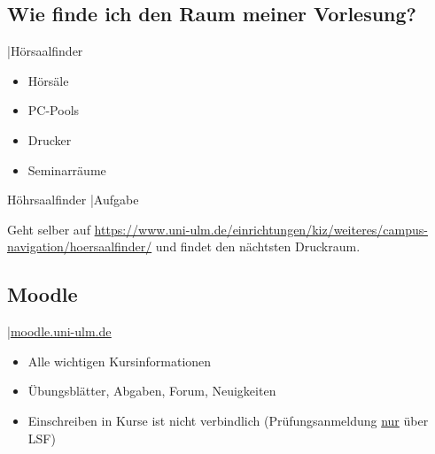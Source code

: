 \documentclass[
	aspectratio=169, 
	10pt 
]{beamer}
\begin{document}
\subsection{Wie finde ich den Raum meiner Vorlesung?}
\begin{frame}{\insertsubsection \space|\space Hörsaalfinder}
    \begin{fancycolumns}[widths={30}]
        
        \nextcolumn
        \centering
        \begin{minipage}[C]{0.8\textwidth}
            \begin{itemize}
                \item Hörsäle
                \item PC-Pools
                \item Drucker 
                \item Seminarräume 
            \end{itemize}
        \end{minipage}
    \end{fancycolumns}
\end{frame}

\begin{frame}{Höhrsaalfinder \space|\space Aufgabe}
    \begin{fancycolumns}[widths={70}]
        \begin{center}
            {\large Geht selber auf \href{https://www.uni-ulm.de/einrichtungen/kiz/weiteres/campus-navigation/hoersaalfinder/}{https://www.uni-ulm.de/einrichtungen/kiz/weiteres/campus-navigation/hoersaalfinder/} und findet den nächtsten Druckraum.}
        \end{center}    
        \nextcolumn
    \end{fancycolumns}
\end{frame}

\subsection{Moodle} %
\begin{frame}{\insertsubsection \space|\space\underline{\href{https://moodle.uni-ulm.de}{moodle.uni-ulm.de}}}
    \begin{itemize}
        \item Alle wichtigen Kursinformationen 
        \item Übungsblätter, Abgaben, Forum, Neuigkeiten
        \item Einschreiben in Kurse ist nicht verbindlich (Prüfungsanmeldung \underline{nur} über LSF)
    \end{itemize}
\end{frame}
\end{document}
